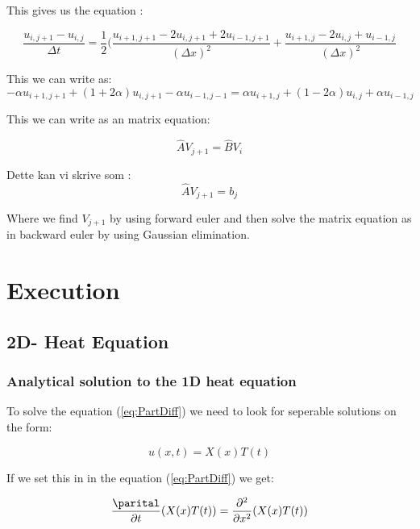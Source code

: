 \documentclass[a4paper,10pt]{article}
\begin{document}
This gives us the equation :

\begin{equation}
 \frac{u_{i,j+1} - u_{i,j}}{\Delta t} = \frac{1}{2}(\frac{u_{i+1,j+1} - 2u_{i,j+1} + 2u_{i-1,j+1}}{(\Delta x)^2} + \frac{u_{i+1,j} - 2u_{i,j}+u_{i-1,j}}{(\Delta x)^2}
\end{equation}

This we can write as:
\begin{equation}
 -\alpha u_{i+1,j+1} + (1+2\alpha)u_{i,j+1} - \alpha u_{i-1,j-1} =  \alpha u_{i+1,j} + (1-2\alpha)u_{i,j} + \alpha u_{i-1,j}

\end{equation}

This we can write as an matrix equation:

\begin{equation}
 \hat{A}V_{j+1} = \hat{B}V_{i}
\end{equation}

Dette kan vi skrive som :
\begin{equation}
 \hat{A}V_{j+1} = b_{j}
\end{equation}

Where we find $V_{j+1}$ by using forward euler and then solve the matrix equation as in backward euler by using Gaussian elimination. 

\section{Execution}
\subsection{2D- Heat Equation}
\subsubsection{Analytical solution to the 1D heat equation}
To solve the equation (\ref{eq:PartDiff}) we need to look for seperable solutions on the form:

\begin{equation}
 u(x,t) = X(x)T(t)
 \label{eq:u_xt}
\end{equation}

If we set this in in the equation (\ref{eq:PartDiff}) we get:

\begin{equation}
 
 \frac{\parital}{\partial t}(X(x)T(t)) = \frac{\partial ^2}{\partial x^2}(X(x)T(t))
\end{equation}
\end{document}
